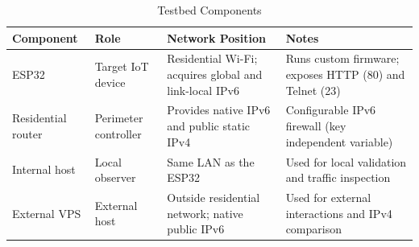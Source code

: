 \begin{table}[H]
    \centering
    \caption{Testbed Components}
    \label{tab:testbed-components}
    \begin{tabularx}{\textwidth}{p{} p{} L L}
        \toprule
        \textbf{\color{white}Component} & \textbf{\color{white}Role} & \textbf{\color{white}Network Position} & \textbf{\color{white}Notes} \\
        \midrule
        ESP32 & Target IoT device & Residential Wi-Fi; acquires global and link-local IPv6 & Runs custom firmware; exposes HTTP (80) and Telnet (23) \\
        Residential router & Perimeter controller & Provides native IPv6 and public static IPv4 & Configurable IPv6 firewall (key independent variable) \\
        Internal host & Local observer & Same LAN as the ESP32 & Used for local validation and traffic inspection \\
        External VPS & External host & Outside residential network; native public IPv6 & Used for external interactions and IPv4 comparison \\
        \bottomrule
    \end{tabularx}
\end{table}
